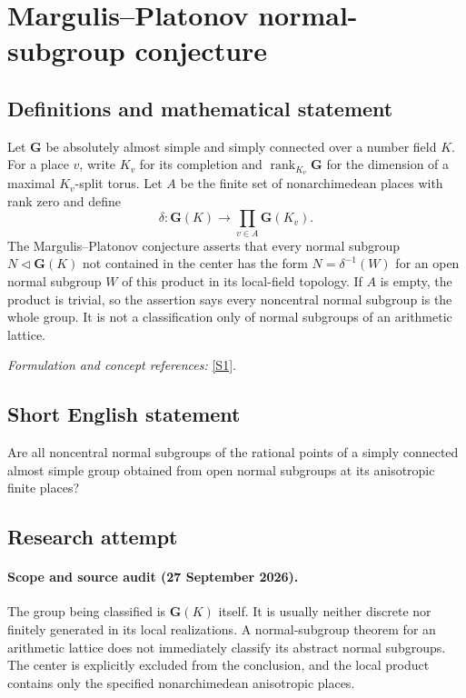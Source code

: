 \documentclass[11pt]{article}
\begin{document}
\section*{\texorpdfstring{Margulis–Platonov normal-subgroup conjecture}{Margulis–Platonov normal-subgroup conjecture}}\label{statement}
\subsection{Definitions and mathematical statement}
Let $\mathbf G$ be absolutely almost simple and simply connected over a number field $K$. For a place $v$, write $K_v$ for its completion and $\operatorname{rank}_{K_v}\mathbf G$ for the dimension of a maximal $K_v$-split torus. Let $A$ be the finite set of nonarchimedean places with rank zero and define
\[
 \delta:\mathbf G(K)\longrightarrow\prod_{v\in A}\mathbf G(K_v).
\]
The Margulis--Platonov conjecture asserts that every normal subgroup $N\triangleleft\mathbf G(K)$ not contained in the center has the form $N=\delta^{-1}(W)$ for an open normal subgroup $W$ of this product in its local-field topology. If $A$ is empty, the product is trivial, so the assertion says every noncentral normal subgroup is the whole group. It is not a classification only of normal subgroups of an arithmetic lattice.
\par\smallskip\textit{Formulation and concept references:} \href{https://arxiv.org/html/2603.27472}{[S1]}.

\subsection{Short English statement}
Are all noncentral normal subgroups of the rational points of a simply connected almost simple group obtained from open normal subgroups at its anisotropic finite places?
\subsection{Research attempt}
\paragraph{Scope and source audit (27 September 2026).}
The group being classified is $\mathbf G(K)$ itself. It is usually
neither discrete nor finitely generated in its local realizations.
A normal-subgroup theorem for an arithmetic lattice does not immediately
classify its abstract normal subgroups. The center is explicitly excluded
from the conclusion, and the local product contains only the specified
nonarchimedean anisotropic places.
\end{document}
